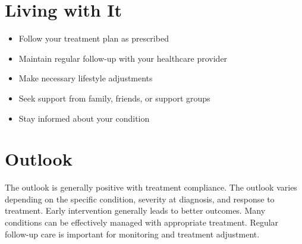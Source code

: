 \section{Living with It}
\begin{itemize}[noitemsep]
  \item Follow your treatment plan as prescribed
  \item Maintain regular follow-up with your healthcare provider
  \item Make necessary lifestyle adjustments
  \item Seek support from family, friends, or support groups
  \item Stay informed about your condition
\end{itemize}
\section{Outlook}
The outlook is generally positive with treatment compliance. The outlook varies depending on the specific condition, severity at diagnosis, and response to treatment. Early intervention generally leads to better outcomes. Many conditions can be effectively managed with appropriate treatment. Regular follow-up care is important for monitoring and treatment adjustment.

